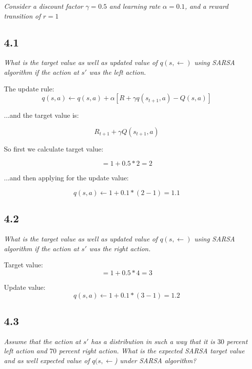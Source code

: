 \documentclass{article}
\begin{document}
\textit{Consider a discount factor $\gamma = 0.5$ and learning rate $\alpha=0.1$, and a reward transition of $r=1$}

\subsection*{4.1}
\textit{What is the target value as well as updated value of $q(s,\leftarrow)$ using SARSA algorithm if the action at $s'$ was the left action.}

The update rule:
\begin{equation}
    q(s,a) \leftarrow q(s,a) + \alpha [R + \gamma q(s_{t+1},a) - Q(s,a)]
\end{equation}

...and the target value is:

\begin{equation}
    R_{t+1} + \gamma Q(s_{t+1}, a)
\end{equation}

So first we calculate target value:

\begin{equation}
    = 1 + 0.5 * 2 = 2
\end{equation}

...and then applying for the update value:

\begin{equation}
    q(s,a) \leftarrow 1 + 0.1 * (2 - 1) = 1.1
\end{equation}

\subsection*{4.2}

\textit{ What is the target value as well as updated value of $q(s, \leftarrow)$ using SARSA algorithm if the action at $s'$ was the right action.}

Target value:
\begin{equation}
    = 1 + 0.5 * 4 = 3
\end{equation}

Update value:
\begin{equation}
    q(s,a) \leftarrow 1 + 0.1 * (3 - 1) = 1.2
\end{equation}

\subsection*{4.3}

\textit{Assume that the action at $s'$ has a distribution in such a way that it is $30$ percent left action and $70$ percent right action. What is the expected SARSA target value and as well expected value of $q(s,\leftarrow$) under SARSA algorithm?}
\end{document}
